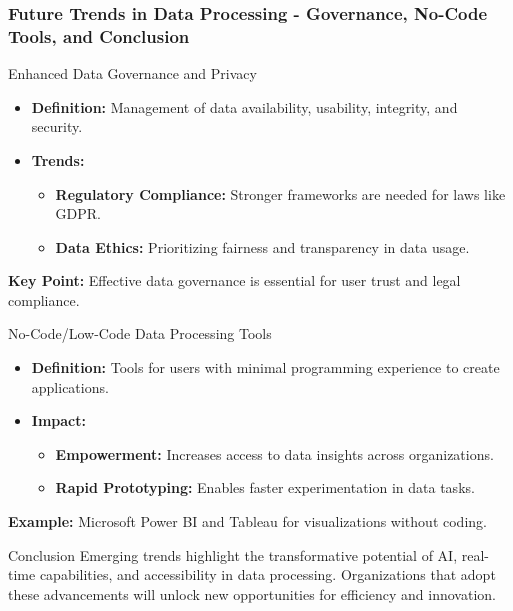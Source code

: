 \documentclass[aspectratio=169]{beamer}
\begin{document}
\begin{frame}[fragile]
    \frametitle{Future Trends in Data Processing - Governance, No-Code Tools, and Conclusion}
    \begin{block}{Enhanced Data Governance and Privacy}
        \begin{itemize}
            \item \textbf{Definition:} Management of data availability, usability, integrity, and security.
            \item \textbf{Trends:}
                \begin{itemize}
                    \item \textbf{Regulatory Compliance:} Stronger frameworks are needed for laws like GDPR.
                    \item \textbf{Data Ethics:} Prioritizing fairness and transparency in data usage.
                \end{itemize}
        \end{itemize}
        \textbf{Key Point:} Effective data governance is essential for user trust and legal compliance.
    \end{block}

    \begin{block}{No-Code/Low-Code Data Processing Tools}
        \begin{itemize}
            \item \textbf{Definition:} Tools for users with minimal programming experience to create applications.
            \item \textbf{Impact:}
                \begin{itemize}
                    \item \textbf{Empowerment:} Increases access to data insights across organizations.
                    \item \textbf{Rapid Prototyping:} Enables faster experimentation in data tasks.
                \end{itemize}
        \end{itemize}
        \textbf{Example:} Microsoft Power BI and Tableau for visualizations without coding.
    \end{block}
    
    \begin{block}{Conclusion}
        Emerging trends highlight the transformative potential of AI, real-time capabilities, and accessibility in data processing. 
        Organizations that adopt these advancements will unlock new opportunities for efficiency and innovation.
    \end{block}
\end{frame}
\end{document}
